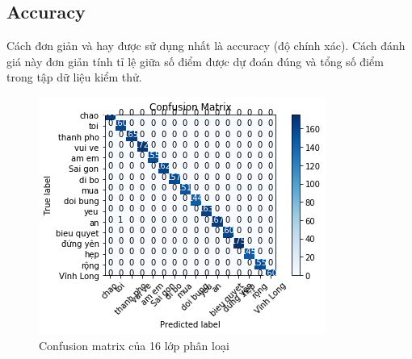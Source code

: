 \subsection{Accuracy}
Cách đơn giản và hay được sử dụng nhất là accuracy (độ chính xác). Cách đánh giá này đơn giản tính tỉ lệ giữa số điểm được dự đoán đúng và tổng số điểm trong tập dữ liệu kiểm thử.
\FloatBarrier
\begin{figure}[htp]
\begin{center}
\includegraphics[scale=1]{chap6/c6_figs/confusion_matrix.png}
\end{center}
\caption{Confusion matrix của 16 lớp phân loại}
\label{fig:pipelineS}
\end{figure}
\FloatBarrier